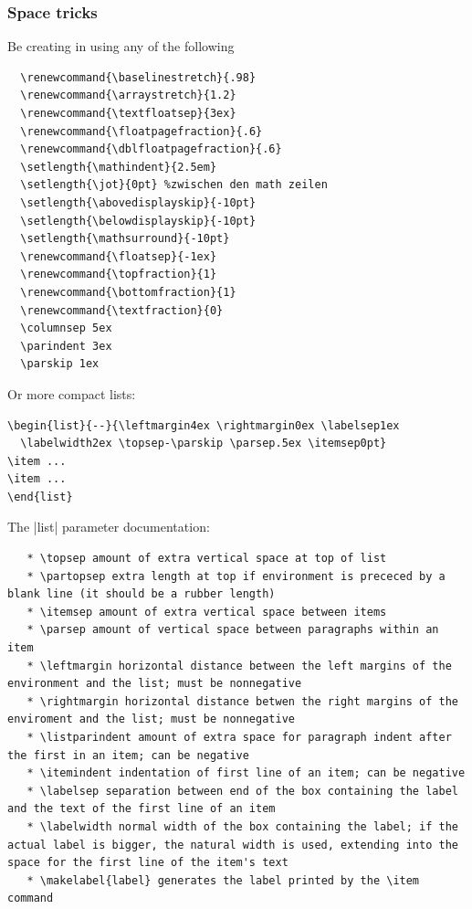 \subsubsection{Space tricks}

Be creating in using any of the following\\
\begin{code}
\begin{verbatim}
  \renewcommand{\baselinestretch}{.98}
  \renewcommand{\arraystretch}{1.2}
  \renewcommand{\textfloatsep}{3ex}
  \renewcommand{\floatpagefraction}{.6}
  \renewcommand{\dblfloatpagefraction}{.6}
  \setlength{\mathindent}{2.5em}
  \setlength{\jot}{0pt} %zwischen den math zeilen
  \setlength{\abovedisplayskip}{-10pt}
  \setlength{\belowdisplayskip}{-10pt}
  \setlength{\mathsurround}{-10pt}
  \renewcommand{\floatsep}{-1ex}
  \renewcommand{\topfraction}{1}
  \renewcommand{\bottomfraction}{1}
  \renewcommand{\textfraction}{0}
  \columnsep 5ex
  \parindent 3ex
  \parskip 1ex
\end{verbatim}
\end{code}

Or more compact lists:\\
\begin{code}
\begin{verbatim}
\begin{list}{--}{\leftmargin4ex \rightmargin0ex \labelsep1ex
  \labelwidth2ex \topsep-\parskip \parsep.5ex \itemsep0pt}
\item ...
\item ...
\end{list}
\end{verbatim}
\end{code}

The |list| parameter documentation:\\
\begin{code}
\begin{verbatim}
   * \topsep amount of extra vertical space at top of list
   * \partopsep extra length at top if environment is prececed by a blank line (it should be a rubber length)
   * \itemsep amount of extra vertical space between items
   * \parsep amount of vertical space between paragraphs within an item
   * \leftmargin horizontal distance between the left margins of the environment and the list; must be nonnegative
   * \rightmargin horizontal distance betwen the right margins of the enviroment and the list; must be nonnegative
   * \listparindent amount of extra space for paragraph indent after the first in an item; can be negative
   * \itemindent indentation of first line of an item; can be negative
   * \labelsep separation between end of the box containing the label and the text of the first line of an item
   * \labelwidth normal width of the box containing the label; if the actual label is bigger, the natural width is used, extending into the space for the first line of the item's text
   * \makelabel{label} generates the label printed by the \item command
\end{verbatim}
\end{code}

